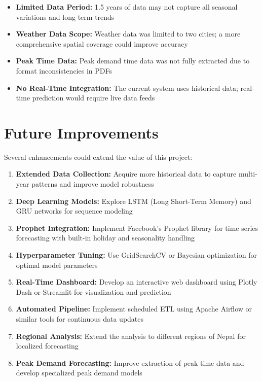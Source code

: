 \begin{itemize}
    \item \textbf{Limited Data Period:} 1.5 years of data may not capture all seasonal variations and long-term trends
    \item \textbf{Weather Data Scope:} Weather data was limited to two cities; a more comprehensive spatial coverage could improve accuracy
    \item \textbf{Peak Time Data:} Peak demand time data was not fully extracted due to format inconsistencies in PDFs
    \item \textbf{No Real-Time Integration:} The current system uses historical data; real-time prediction would require live data feeds
\end{itemize}

\section{Future Improvements}
Several enhancements could extend the value of this project:

\begin{enumerate}
    \item \textbf{Extended Data Collection:} Acquire more historical data to capture multi-year patterns and improve model robustness

    \item \textbf{Deep Learning Models:} Explore LSTM (Long Short-Term Memory) and GRU networks for sequence modeling

    \item \textbf{Prophet Integration:} Implement Facebook's Prophet library for time series forecasting with built-in holiday and seasonality handling

    \item \textbf{Hyperparameter Tuning:} Use GridSearchCV or Bayesian optimization for optimal model parameters

    \item \textbf{Real-Time Dashboard:} Develop an interactive web dashboard using Plotly Dash or Streamlit for visualization and prediction

    \item \textbf{Automated Pipeline:} Implement scheduled ETL using Apache Airflow or similar tools for continuous data updates

    \item \textbf{Regional Analysis:} Extend the analysis to different regions of Nepal for localized forecasting

    \item \textbf{Peak Demand Forecasting:} Improve extraction of peak time data and develop specialized peak demand models
\end{enumerate}

